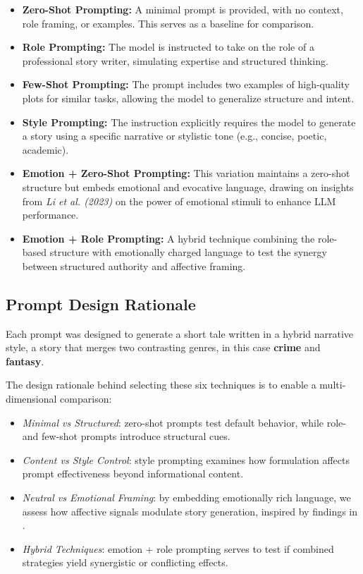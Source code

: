 \documentclass[12pt]{article}
\begin{document}
\begin{itemize}
    \item \textbf{Zero-Shot Prompting:} A minimal prompt is provided, with no context, role framing, or examples. This serves as a baseline for comparison.
    
    \item \textbf{Role Prompting:} The model is instructed to take on the role of a professional story writer, simulating expertise and structured thinking.
    
    \item \textbf{Few-Shot Prompting:} The prompt includes two examples of high-quality plots for similar tasks, allowing the model to generalize structure and intent.
    
    \item \textbf{Style Prompting:} The instruction explicitly requires the model to generate a story using a specific narrative or stylistic tone (e.g., concise, poetic, academic).
    
    \item \textbf{Emotion + Zero-Shot Prompting:} This variation maintains a zero-shot structure but embeds emotional and evocative language, drawing on insights from \textit{Li et al. (2023)} on the power of emotional stimuli to enhance LLM performance.
    
    \item \textbf{Emotion + Role Prompting:} A hybrid technique combining the role-based structure with emotionally charged language to test the synergy between structured authority and affective framing.
\end{itemize}

\subsection{Prompt Design Rationale}

Each prompt was designed to generate a short tale written in a hybrid narrative style, a story that merges two contrasting genres, in this case \textbf{crime} and \textbf{fantasy}.

The design rationale behind selecting these six techniques is to enable a multi-dimensional comparison:
\begin{itemize}
    \item \textit{Minimal vs Structured}: zero-shot prompts test default behavior, while role- and few-shot prompts introduce structural cues.
    \item \textit{Content vs Style Control}: style prompting examines how formulation affects prompt effectiveness beyond informational content.
    \item \textit{Neutral vs Emotional Framing}: by embedding emotionally rich language, we assess how affective signals modulate story generation, inspired by findings in \cite{emotions}.
    \item \textit{Hybrid Techniques}: emotion + role prompting serves to test if combined strategies yield synergistic or conflicting effects.
\end{itemize}
\end{document}
